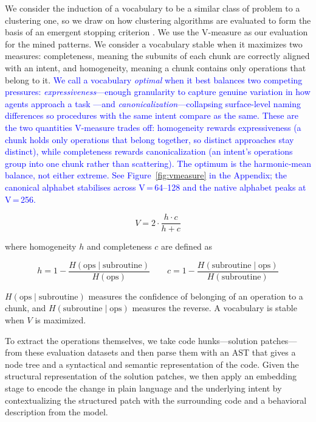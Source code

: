 \documentclass[11pt]{article}
\begin{document}
We consider the induction of a vocabulary to be a similar class of problem to a clustering one, so we draw on how clustering algorithms are evaluated to form the basis of an emergent stopping criterion \cite{rosenberg-hirschberg-2007-v}. We use the V-measure as our evaluation for the mined patterns. We consider a vocabulary stable when it maximizes two measures: completeness, meaning the subunits of each chunk are correctly aligned with an intent, and homogeneity, meaning a chunk contains only operations that belong to it. \textcolor{blue}{We call a vocabulary \emph{optimal} when it best balances two competing pressures: \emph{expressiveness}---enough granularity to capture genuine variation in how agents approach a task \cite{glassman2015overcode}---and \emph{canonicalization}---collapsing surface-level naming differences so procedures with the same intent compare as the same. These are the two quantities V-measure trades off: homogeneity rewards expressiveness (a chunk holds only operations that belong together, so distinct approaches stay distinct), while completeness rewards canonicalization (an intent's operations group into one chunk rather than scattering). The optimum is the harmonic-mean balance, not either extreme.} \textcolor{blue}{See Figure~\ref{fig:vmeasure} in the Appendix; the canonical alphabet stabilises across V\,=\,64--128 and the native alphabet peaks at V\,=\,256.}

\[
V = 2 \cdot \frac{h \cdot c}{h + c}
\]

where homogeneity $h$ and completeness $c$ are defined as

\[
h = 1 - \frac{H(\text{ops} \mid \text{subroutine})}{H(\text{ops})} \qquad c = 1 - \frac{H(\text{subroutine} \mid \text{ops})}{H(\text{subroutine})}
\]

$H(\text{ops} \mid \text{subroutine})$ measures the confidence of belonging of an operation to a chunk, and $H(\text{subroutine} \mid \text{ops})$ measures the reverse. A vocabulary is stable when $V$ is maximized.

To extract the operations themselves, we take code hunks---solution patches---from these evaluation datasets and then parse them with an AST that gives a node tree and a syntactical and semantic representation of the code. Given the structural representation of the solution patches, we then apply an embedding stage to encode the change in plain language and the underlying intent by contextualizing the structured patch with the surrounding code and a behavioral description from the model.
\end{document}
